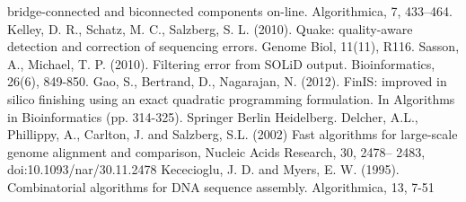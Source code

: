 \documentclass[compress]{beamer}
\begin{document}
\begin{frame}[allowframebreaks]
\begin{thebibliography}{widest entry}
        bridge-connected and biconnected components on-line. Algorithmica, 7,
        433–464.
       Kelley, D. R., Schatz, M. C., Salzberg, S. L. (2010). Quake:
        quality-aware detection and correction of sequencing errors. Genome Biol,
        11(11), R116.
       Sasson, A., Michael, T. P. (2010). Filtering error
        from SOLiD output. Bioinformatics, 26(6), 849-850.
       Gao, S., Bertrand, D., Nagarajan, N. (2012). FinIS: improved
        in silico finishing using an exact quadratic programming formulation. In
        Algorithms in Bioinformatics (pp. 314-325). Springer Berlin Heidelberg.
       Delcher, A.L., Phillippy, A., Carlton, J. and Salzberg, S.L.
        (2002) Fast algorithms for large-scale genome alignment and comparison,
        Nucleic Acids Research, 30, 2478– 2483, doi:10.1093/nar/30.11.2478
       Kececioglu, J. D. and Myers, E. W. (1995). Combinatorial algorithms
        for DNA sequence assembly. Algorithmica, 13, 7-51
    \end{thebibliography}
  \end{frame}
\end{document}
